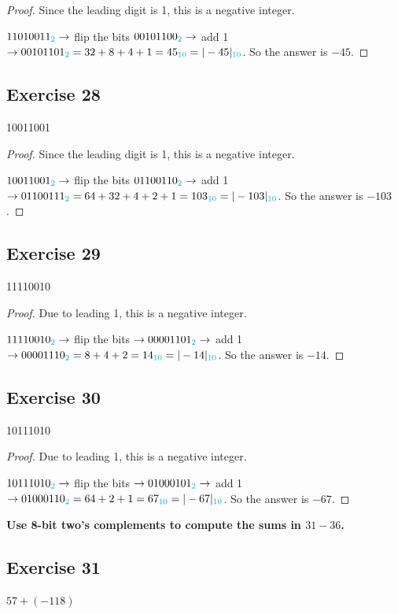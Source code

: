 \documentclass[14pt]{extarticle}
\newcommand{\base}[1]{{\color{cyan}#1}}
\begin{document}
\begin{proof}
Since the leading digit is 1, this is a negative integer.

$11010011_\base{2} \to $ flip the bits $00101100_\base{2} \to$ add 1 $\to 00101101_\base{2} = 32 + 8 + 4 + 1 = 45_\base{10} = |-45|_\base{10}$. So the answer is $-45$.
\end{proof}

\subsection{Exercise 28}
10011001

\begin{proof}
Since the leading digit is 1, this is a negative integer.

$10011001_\base{2} \to $ flip the bits $01100110_\base{2} \to$ add 1 $\to 01100111_\base{2} = 64 + 32 + 4 + 2 + 1 = 103_\base{10} = |-103|_\base{10}$. So the answer is $-103$.
\end{proof}

\subsection{Exercise 29}
11110010

\begin{proof}
Due to leading 1, this is a negative integer.

$11110010_\base{2}
\to $ flip the bits $\to 00001101_\base{2} \to$ add 1 $\to 00001110_\base{2} = 8 + 4 + 2 = 14_\base{10} = |-14|_\base{10}$. So the answer is $-14$.
\end{proof}

\subsection{Exercise 30}
10111010

\begin{proof}
Due to leading 1, this is a negative integer.

$10111010_\base{2} \to $ flip the bits $\to 01000101_\base{2} \to$ add 1 $\to 01000110_\base{2} = 64 + 2 + 1 = 67_\base{10} = |-67|_\base{10}$. So the answer is $-67$.
\end{proof}

{\bf \color{cyan} Use 8-bit two’s complements to compute the sums in $31-36$.}

\subsection{Exercise 31}
$57 + (-118)$
\end{document}
